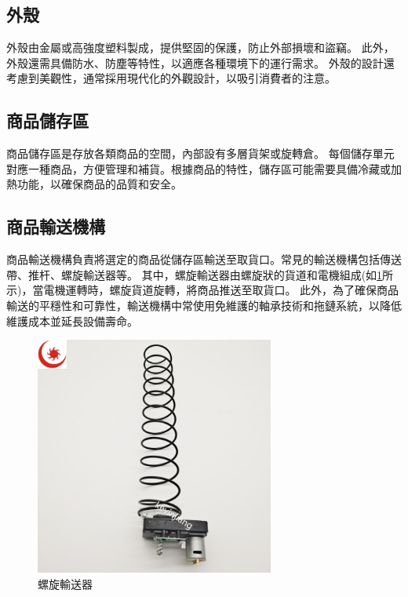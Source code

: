\documentclass[12pt]{article}       %
\begin{document}
\subsection{外殼} 
\hspace{2em}
外殼由金屬或高強度塑料製成，提供堅固的保護，防止外部損壞和盜竊。
此外，外殼還需具備防水、防塵等特性，以適應各種環境下的運行需求。
外殼的設計還考慮到美觀性，通常採用現代化的外觀設計，以吸引消費者的注意。

\subsection{商品儲存區} 
\hspace{2em}
商品儲存區是存放各類商品的空間，內部設有多層貨架或旋轉倉。
每個儲存單元對應一種商品，方便管理和補貨。根據商品的特性，儲存區可能需要具備冷藏或加熱功能，以確保商品的品質和安全。

\subsection{商品輸送機構} 
\hspace{2em}
商品輸送機構負責將選定的商品從儲存區輸送至取貨口。常見的輸送機構包括傳送帶、推杆、螺旋輸送器等。
其中，螺旋輸送器由螺旋狀的貨道和電機組成(如\ref{fig:example1}所示)，當電機運轉時，螺旋貨道旋轉，將商品推送至取貨口。 
此外，為了確保商品輸送的平穩性和可靠性，輸送機構中常使用免維護的軸承技術和拖鏈系統，以降低維護成本並延長設備壽命。
\begin{figure}[H]
    \centering
    \includegraphics[width=0.7\textwidth]{f33314bafa00371813bbc9cd507c90fb.jpg}     %
    \caption{螺旋輸送器\cite{lazada_vending_machine_2025}}    %
    \label{fig:example1}    %
\end{figure} 
\end{document}
